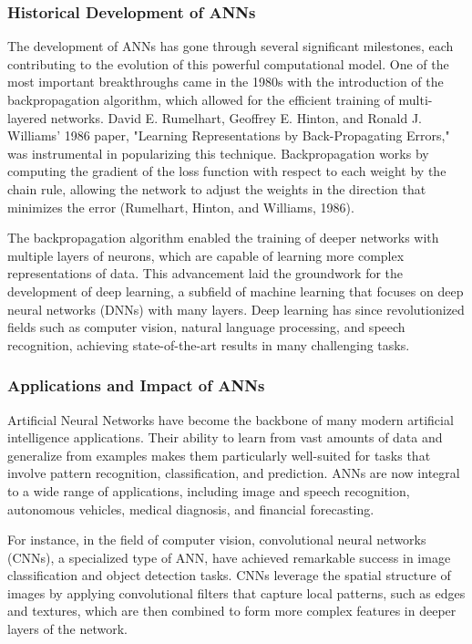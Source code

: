 \documentclass[12pt,twoside]{article}
\begin{document}
\subsubsection{Historical Development of ANNs}

The development of ANNs has gone through several significant milestones, each contributing to the evolution of this powerful computational model. One of the most important breakthroughs came in the 1980s with the introduction of the backpropagation algorithm, which allowed for the efficient training of multi-layered networks. David E. Rumelhart, Geoffrey E. Hinton, and Ronald J. Williams' 1986 paper, "Learning Representations by Back-Propagating Errors," was instrumental in popularizing this technique. Backpropagation works by computing the gradient of the loss function with respect to each weight by the chain rule, allowing the network to adjust the weights in the direction that minimizes the error (Rumelhart, Hinton, and Williams, 1986).

The backpropagation algorithm enabled the training of deeper networks with multiple layers of neurons, which are capable of learning more complex representations of data. This advancement laid the groundwork for the development of deep learning, a subfield of machine learning that focuses on deep neural networks (DNNs) with many layers. Deep learning has since revolutionized fields such as computer vision, natural language processing, and speech recognition, achieving state-of-the-art results in many challenging tasks.

\subsubsection{Applications and Impact of ANNs}

Artificial Neural Networks have become the backbone of many modern artificial intelligence applications. Their ability to learn from vast amounts of data and generalize from examples makes them particularly well-suited for tasks that involve pattern recognition, classification, and prediction. ANNs are now integral to a wide range of applications, including image and speech recognition, autonomous vehicles, medical diagnosis, and financial forecasting.

For instance, in the field of computer vision, convolutional neural networks (CNNs), a specialized type of ANN, have achieved remarkable success in image classification and object detection tasks. CNNs leverage the spatial structure of images by applying convolutional filters that capture local patterns, such as edges and textures, which are then combined to form more complex features in deeper layers of the network.
\end{document}
